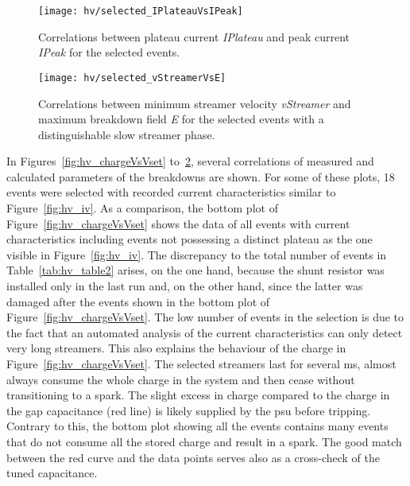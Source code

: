 \begin{figure}[p]
	\centering
	\texttt{[image: hv/selected\_IPlateauVsIPeak]}
	\caption[ test plateau current versus peak current]{%
		Correlations between plateau current \emph{IPlateau} and peak current \emph{IPeak} for the selected events.
		}
	\label{fig:hv_IPlateauVsIPeak}
\end{figure}

\begin{figure}[p]
	\centering
	\texttt{[image: hv/selected\_vStreamerVsE]}
	\caption[ test minimum streamer velocity versus maximum breakdown field]{%
		Correlations between minimum streamer velocity \emph{vStreamer} and maximum breakdown field \emph{E} for the selected events with a distinguishable slow streamer phase.
	}
	\label{fig:hv_vStreamerVsE}
\end{figure}

In Figures~\ref{fig:hv_chargeVsVset} to~\ref{fig:hv_vStreamerVsE}, several correlations of measured and calculated parameters of the breakdowns are shown.
For some of these plots, \num{18} events were selected with recorded current characteristics similar to Figure~\ref{fig:hv_iv}.
As a comparison, the bottom plot of Figure~\ref{fig:hv_chargeVsVset} shows the data of all events with current characteristics including events not possessing a distinct plateau as the one visible in Figure~\ref{fig:hv_iv}.
The discrepancy to the total number of events in Table~\ref{tab:hv_table2} arises, on the one hand, because the shunt resistor was installed only in the last run and, on the other hand, since the latter was damaged after the events shown in the bottom plot of Figure~\ref{fig:hv_chargeVsVset}.
The low number of events in the selection is due to the fact that an automated analysis of the current characteristics can only detect very long streamers.
This also explains the behaviour of the charge in Figure~\ref{fig:hv_chargeVsVset}.
The selected streamers last for several \si{\milli\second}, almost always consume the whole charge in the system and then cease without transitioning to a spark.
The slight excess in charge compared to the charge in the gap capacitance (red line) is likely supplied by the \gls{psu} before tripping.
Contrary to this, the bottom plot showing all the events contains many events that do not consume all the stored charge and result in a spark.
The good match between the red curve and the data points serves also as a cross-check of the tuned capacitance.

